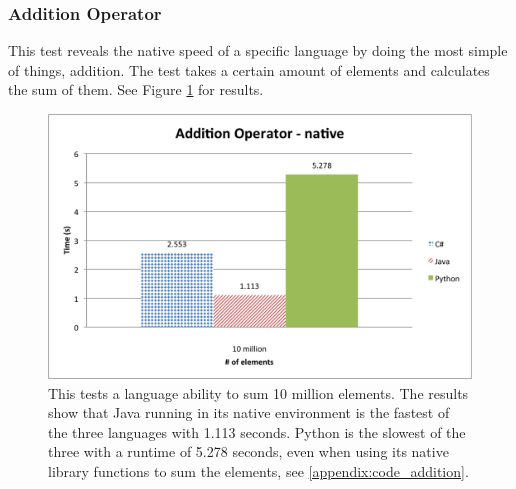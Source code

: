 \subsubsection{Addition Operator}

This test reveals the native speed of a specific language by doing the most simple of things, addition. The test takes a certain amount of elements and calculates the sum of them. See Figure \ref{fig:native_addition} for results.

\begin{figure}[h]
	\centering
	\includegraphics[width=1.0\linewidth]{chapters/new_media/AdditionOperatorNative.png}
	\caption{This tests a language ability to sum 10 million elements. The results show that Java running in its native environment is the fastest of the three languages with 1.113 seconds. Python is the slowest of the three with a runtime of 5.278 seconds, even when using its native library functions to sum the elements, see \ref{appendix:code_addition}.}
	\label{fig:native_addition}
\end{figure}
